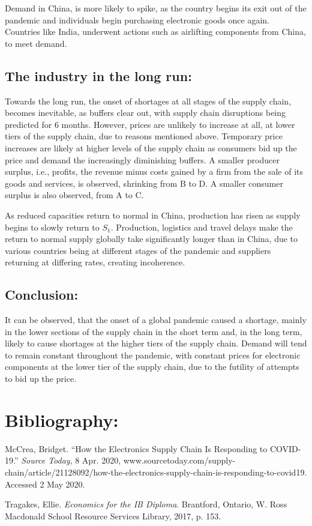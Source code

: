 \documentclass[11pt, a4paper]{article}
\begin{document}
			\bigbreak

			Demand in China, is more likely to spike, as the country begins its exit out of the pandemic and individuals begin purchasing electronic goods once again. Countries like India, underwent actions such as airlifting components from China, to meet demand.

		\subsection{The industry in the long run:}
			
			Towards the long run, the onset of shortages at all stages of the supply chain, becomes inevitable, as buffers clear out, with supply chain disruptions being predicted for 6 months. However, prices are unlikely to increase at all, at lower tiers of the supply chain, due to reasons mentioned above. Temporary price increases are likely at higher levels of the supply chain as consumers bid up the price and demand the increasingly diminishing buffers. A smaller producer surplus, i.e., profits, the revenue minus costs gained by a firm from the sale of its goods and services, is observed, shrinking from B to D. A smaller consumer surplus is also observed, from A to C.

			\bigbreak

			As reduced capacities return to normal in China, production has risen as supply begins to slowly return to $S_1$. Production, logistics and travel delays make the return to normal supply globally take significantly longer than in China, due to various countries being at different stages of the pandemic and suppliers returning at differing rates, creating incoherence.
		
		\subsection{Conclusion:}
			It can be observed, that the onset of a global pandemic caused a shortage, mainly in the lower sections of the supply chain in the short term and, in the long term, likely to cause shortages at the higher tiers of the supply chain. Demand will tend to remain constant throughout the pandemic, with constant prices for electronic components at the lower tier of the supply chain, due to the futility of attempts to bid up the price.
	
	\section{Bibliography:}
		McCrea, Bridget. “How the Electronics Supply Chain Is Responding to COVID-19.” \textit{Source Today}, 8 Apr. 2020, www.sourcetoday.com/supply-chain/article/21128092/how-the-electronics-supply-chain-is-responding-to-covid19. Accessed 2 May 2020.
	
		Tragakes, Ellie. \textit{Economics for the IB Diploma}. Brantford, Ontario, W. Ross Macdonald School Resource Services Library, 2017, p. 153.
	
	‌
\end{document}
